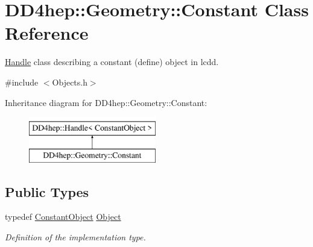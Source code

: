 \hypertarget{class_d_d4hep_1_1_geometry_1_1_constant}{}\section{D\+D4hep\+:\+:Geometry\+:\+:Constant Class Reference}
\label{class_d_d4hep_1_1_geometry_1_1_constant}


\hyperlink{class_d_d4hep_1_1_handle}{Handle} class describing a constant (define) object in lcdd.  




{\ttfamily \#include $<$Objects.\+h$>$}

Inheritance diagram for D\+D4hep\+:\+:Geometry\+:\+:Constant\+:\begin{figure}[H]
\begin{center}
\leavevmode
\includegraphics[height=2.000000cm]{class_d_d4hep_1_1_geometry_1_1_constant}
\end{center}
\end{figure}
\subsection*{Public Types}
\begin{DoxyCompactItemize}
\item 
typedef \hyperlink{class_d_d4hep_1_1_geometry_1_1_constant_object}{Constant\+Object} \hyperlink{class_d_d4hep_1_1_geometry_1_1_constant_abff9d4c7bfbabd0f61a46253c4b79e70}{Object}
\begin{DoxyCompactList}\small\item\em Definition of the implementation type. \end{DoxyCompactList}\end{DoxyCompactItemize}
